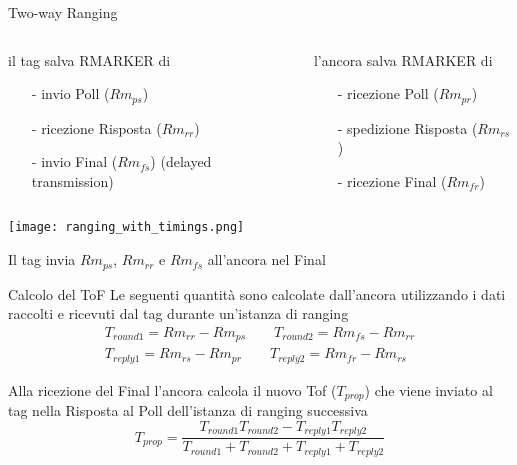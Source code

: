 \begin{frame}{Two-way Ranging}
  \begin{columns}[T]
    \begin{column}{0.5\textwidth}
      il \alert{tag} salva RMARKER di
      \begin{itemize}
      \item[-] invio Poll ($Rm_{ps}$)
      \item[-] ricezione Risposta ($Rm_{rr}$)
      \item[-] invio Final ($Rm_{fs}$) (delayed transmission)
      \end{itemize}
    \end{column}
    \begin{column}{0.5\textwidth}
      l'\alert{ancora} salva RMARKER di
      \begin{itemize}
      \item[-] ricezione Poll ($Rm_{pr}$)
      \item[-] spedizione Risposta ($Rm_{rs}$)
      \item[-] ricezione Final ($Rm_{fr}$)
      \end{itemize}
    \end{column}
  \end{columns}
  \begin{center}
    \texttt{[image: ranging\_with\_timings.png]}
  \end{center}
  Il tag invia $Rm_{ps}$, $Rm_{rr}$ e $Rm_{fs}$ all'ancora nel Final
\end{frame}

\begin{frame}{Calcolo del ToF}
  Le seguenti quantità sono \alert{calcolate} dall'\alert{ancora} utilizzando i dati raccolti e
  ricevuti dal tag durante un'istanza di ranging
  \[
  \begin{split}
    T_{round1} = Rm_{rr} - Rm_{ps} \quad \quad T_{round2} = Rm_{fs} - Rm_{rr}\\
    T_{reply1} = Rm_{rs} - Rm_{pr} \quad \quad T_{reply2} = Rm_{fr} - Rm_{rs}
  \end{split}
  \]

  Alla ricezione del Final l'ancora calcola il nuovo Tof ($T_{prop}$) che viene inviato al tag nella Risposta al Poll dell'istanza di ranging \alert{successiva}
  \[
  T_{prop} = \frac{T_{round1} T_{round2} - T_{reply1} T_{reply2}}{T_{round1} + T_{round2} + T_{reply1} + T_{reply2}}
  \]
\end{frame}

